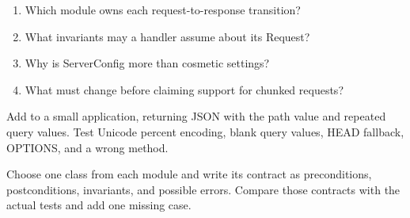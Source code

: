 \reviewtitle
\begin{enumerate}
  \item Which module owns each request-to-response transition?
  \item What invariants may a handler assume about its Request?
  \item Why is ServerConfig more than cosmetic settings?
  \item What must change before claiming support for chunked requests?
\end{enumerate}

\begin{exercise}
Add  to a small application, returning JSON with the
path value and repeated  query values. Test Unicode percent encoding,
blank query values, HEAD fallback, OPTIONS, and a wrong method.
\end{exercise}

\begin{exercise}
Choose one class from each module and write its contract as preconditions,
postconditions, invariants, and possible errors. Compare those contracts with
the actual tests and add one missing case.
\end{exercise}

